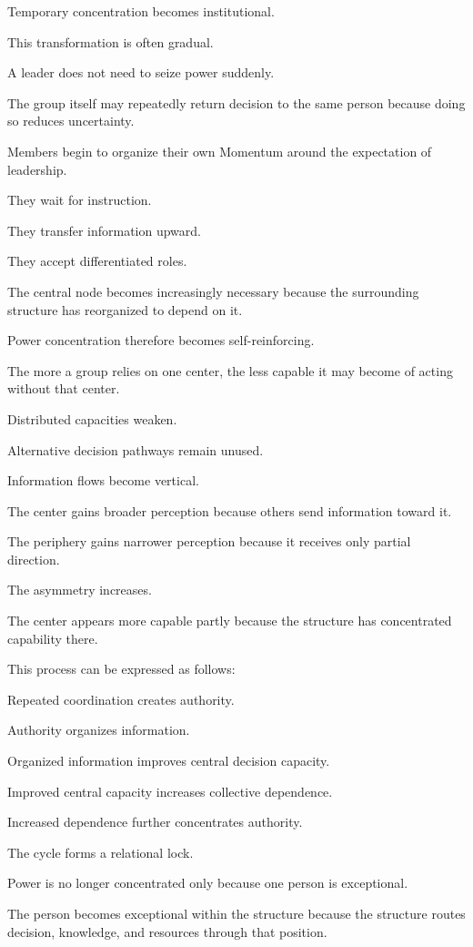 Temporary concentration becomes institutional.

This transformation is often gradual.

A leader does not need to seize power suddenly.

The group itself may repeatedly return decision to the same person because doing so reduces uncertainty.

Members begin to organize their own Momentum around the expectation of leadership.

They wait for instruction.

They transfer information upward.

They accept differentiated roles.

The central node becomes increasingly necessary because the surrounding structure has reorganized to depend on it.

Power concentration therefore becomes self-reinforcing.

The more a group relies on one center, the less capable it may become of acting without that center.

Distributed capacities weaken.

Alternative decision pathways remain unused.

Information flows become vertical.

The center gains broader perception because others send information toward it.

The periphery gains narrower perception because it receives only partial direction.

The asymmetry increases.

The center appears more capable partly because the structure has concentrated capability there.

This process can be expressed as follows:

Repeated coordination creates authority.

Authority organizes information.

Organized information improves central decision capacity.

Improved central capacity increases collective dependence.

Increased dependence further concentrates authority.

The cycle forms a relational lock.

Power is no longer concentrated only because one person is exceptional.

The person becomes exceptional within the structure because the structure routes decision, knowledge, and resources through that position.

